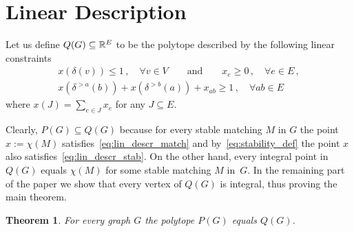 \documentclass[preprint]{elsarticle}
\newtheorem{theorem}[fact]{Theorem}
\begin{document}
\section{Linear Description}
Let us define $Q(G)\subseteq\mathbb{R}^E$ to be the polytope described by the
following linear constraints
\begin{align}
  x(\delta(v)) \leq 1\,,\quad \forall v \in V\qquad \text{and} \qquad x_e \geq 0\,,\quad \forall e \in E\,,\label{eq:lin_descr_match}\\
  x(\delta^{>a}(b))+ x(\delta^{>b}(a)) + x_{ab} \geq 1\,, \quad \forall ab \in E \label{eq:lin_descr_stab}
\end{align}
where $x(J) = \sum_{e \in J} x_e$ for any $J \subseteq E$.

Clearly, $P(G)\subseteq Q(G)$ because for every stable matching $M$ in
$G$ the point $x:=\chi(M)$ satisfies~\eqref{eq:lin_descr_match} and
by~\eqref{eq:stability_def} the point $x$ also
satisfies~\eqref{eq:lin_descr_stab}. On the other hand, every integral
point in $Q(G)$ equals $\chi(M)$ for some stable matching $M$
in~$G$. In the remaining part of the paper we show that every vertex
of $Q(G)$ is integral, thus proving the main theorem.

\begin{theorem}
	For every graph $G$ the polytope $P(G)$ equals $Q(G)$.
\end{theorem}
\end{document}
